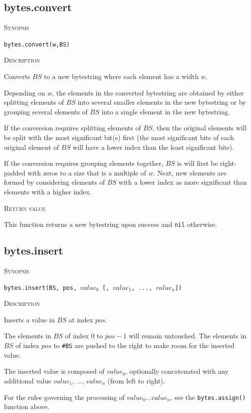 \documentclass[11pt]{report}
\newcommand{\mansection}[1]{\vspace{0.5em}\par\noindent\textsc{#1}\vspace{0.5em}\par}
\begin{document}
\subsection{bytes.convert}

\mansection{Synopsis}
\texttt{bytes.convert(w,BS)}

\mansection{Description}
  Converts $BS$ to a new bytestring where each element has a width $w$.

  Depending on $w$, the elements in the converted bytestring are obtained by either 
  splitting elements of $BS$ into several smaller elements in the new bytestring or 
  by grouping several elements of $BS$ into a single element in the new bytestring.

  If the conversion requires splitting elements of $BS$, then the original elements will
  be split with the most significant bit(s) first (the most significant bits of each 
  original element of $BS$ will have a lower index than the least significant bits). 

  If the conversion requires grouping elements together, $BS$ is will first be 
  right-padded with zeros to a size that is a multiple of $w$. Next, new 
  elements are formed by considering elements of $BS$ with a lower index as more 
  significant than elements with a higher index.

\mansection{Return value}
  This function returns a new bytestring upon success and \texttt{nil} otherwise.

\subsection{bytes.insert}

\mansection{Synopsis}
\texttt{bytes.insert(BS, pos, $value_0$ [, $value_1$, ..., $value_n$])}

\mansection{Description}
  Inserts a value in $BS$ at index $pos$.

  The elements in $BS$ of index 0 to $pos-1$ will remain untouched.
  The elements in $BS$ of index $pos$ to \texttt{\#BS} are pushed to the right
  to make room for the inserted value.

  The inserted value is composed of $value_0$, optionally concatenated with
  any additional value $value_1$, ..., $value_n$ (from left to right).

  For the rules governing the processing of $value_0 ... value_n$, see
  the \texttt{bytes.assign()} function above.
\end{document}
